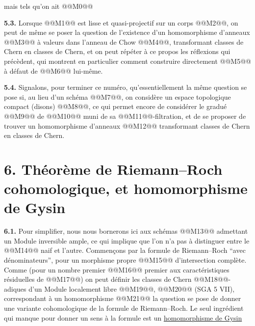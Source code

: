 
mais tels qu'on ait
@@M0@@

\textbf{5.3.} Lorsque @@M1@@ est lisse et quasi-projectif sur un corps @@M2@@, on peut de même se poser la question de l'existence d'un homomorphisme d'anneaux
@@M3@@
à valeurs dans l'anneau de Chow @@M4@@, transformant classes de Chern en classes de Chern, et on peut répéter à ce propos les réflexions qui précèdent, qui montrent en particulier comment construire directement @@M5@@ à défaut de @@M6@@ lui-même.

\textbf{5.4.} Signalons, pour terminer ce numéro, qu'essentiellement la même question se pose si, au lieu d'un schéma @@M7@@, on considère un espace topologique compact (disons) @@M8@@, ce qui permet encore de considérer le gradué @@M9@@ de @@M10@@ muni de sa @@M11@@-filtration, et de se proposer de trouver un homomorphisme d'anneaux
@@M12@@
transformant classes de Chern en classes de Chern.

\section*{6. Théorème de Riemann--Roch cohomologique, et homomorphisme de Gysin}

\textbf{6.1.} Pour simplifier, nous nous bornerons ici aux schémas @@M13@@ admettant un Module inversible ample, ce qui implique que l'on n'a pas à distinguer entre le @@M14@@ naif et l'autre. Commençons par la formule de Riemann--Roch ``avec dénominateurs'', pour un morphisme propre @@M15@@ d'intersection complète. Comme (pour un nombre premier @@M16@@ premier aux caractéristiques résiduelles de @@M17@@) on peut définir les classes de Chern @@M18@@-adiques d'un Module localement libre @@M19@@,
@@M20@@
(SGA 5 VII), correspondant à un homomorphisme
@@M21@@
la question se pose de donner une variante cohomologique de la formule de Riemann--Roch. Le seul ingrédient qui manque pour donner un sens à la formule est un \uline{homomorphisme de Gysin}
